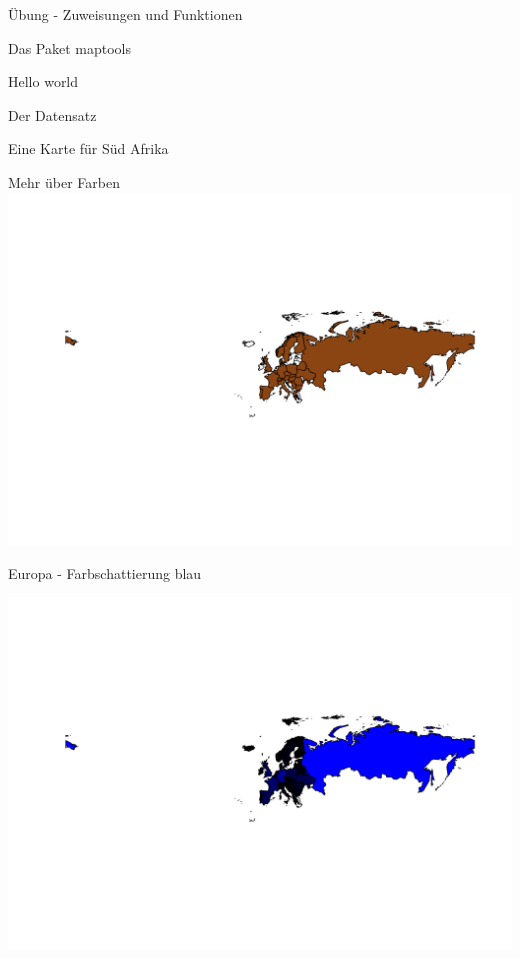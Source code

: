 \documentclass[ignorenonframetext,]{beamer}
\newenvironment{Shaded}{\begin{snugshade}}{\end{snugshade}}
\newcommand{\DataTypeTok}[1]{\textcolor[rgb]{0.74,0.68,0.62}{\underline{#1}}}
\newcommand{\DecValTok}[1]{\textcolor[rgb]{0.27,0.67,0.26}{#1}}
\newcommand{\KeywordTok}[1]{\textcolor[rgb]{0.26,0.66,0.93}{\textbf{#1}}}
\newcommand{\NormalTok}[1]{\textcolor[rgb]{0.74,0.68,0.62}{#1}}
\newcommand{\OperatorTok}[1]{\textcolor[rgb]{0.74,0.68,0.62}{#1}}
\newcommand{\StringTok}[1]{\textcolor[rgb]{0.02,0.61,0.04}{#1}}
\begin{document}
\begin{frame}[fragile]{Übung - Zuweisungen und Funktionen}
\begin{frame}[fragile]{Das Paket maptools}
\begin{frame}[fragile]{Hello world}
\begin{frame}[fragile]{Der Datensatz}
\begin{frame}[fragile]{Eine Karte für Süd Afrika}
\begin{frame}{Mehr über Farben}
\includegraphics{Geomedizin_files/figure-beamer/unnamed-chunk-78-1.pdf}

\end{frame}

\begin{frame}[fragile]{Europa - Farbschattierung blau}
\protect\hypertarget{europa---farbschattierung-blau}{}

\begin{Shaded}
\end{Shaded}

\includegraphics{Geomedizin_files/figure-beamer/unnamed-chunk-79-1.pdf}


\end{frame}
\end{frame}
\end{frame}
\end{frame}
\end{frame}
\end{frame}
\end{document}
